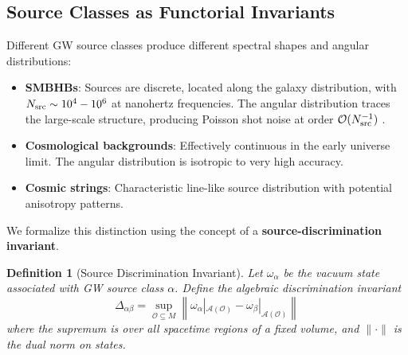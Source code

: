 \documentclass[11pt,a4paper]{article}
\newtheorem{definition}{Definition}[section]
\begin{document}
\subsection{Source Classes as Functorial Invariants}\label{sec:source-classes}

Different GW source classes produce different spectral shapes and angular distributions:

\begin{itemize}
\item \textbf{SMBHBs}: Sources are discrete, located along the galaxy distribution, with $N_{\rm src} \sim 10^4-10^6$ at nanohertz frequencies. The angular distribution traces the large-scale structure, producing Poisson shot noise at order $\mathcal{O}(N_{\rm src}^{-1})$ \cite{Rogers:2016}.
\item \textbf{Cosmological backgrounds}: Effectively continuous in the early universe limit. The angular distribution is isotropic to very high accuracy.
\item \textbf{Cosmic strings}: Characteristic line-like source distribution with potential anisotropy patterns.
\end{itemize}

We formalize this distinction using the concept of a \textbf{source-discrimination invariant}.

\begin{definition}[Source Discrimination Invariant]
Let $\omega_\alpha$ be the vacuum state associated with GW source class $\alpha$. Define the algebraic discrimination invariant
\begin{equation}
\Delta_{\alpha\beta} = \sup_{\mathcal{O} \subseteq M} \left\| \omega_\alpha|_{\mathcal{A}(\mathcal{O})} - \omega_\beta|_{\mathcal{A}(\mathcal{O})} \right\|
\end{equation}
where the supremum is over all spacetime regions of a fixed volume, and $\|\cdot\|$ is the dual norm on states.
\end{definition}
\end{document}
